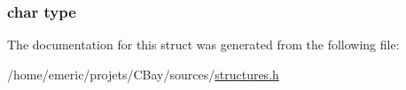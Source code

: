 \hypertarget{struct_user_account_aff17911edc8208aa8ddb1c7c52c78389}{
\subsubsection[{type}]{\setlength{\rightskip}{0pt plus 5cm}char type}}\label{struct_user_account_aff17911edc8208aa8ddb1c7c52c78389}


The documentation for this struct was generated from the following file\-:\begin{DoxyCompactItemize}
\item 
/home/emeric/projets/\-C\-Bay/sources/\hyperlink{structures_8h}{structures.\-h}\end{DoxyCompactItemize}
